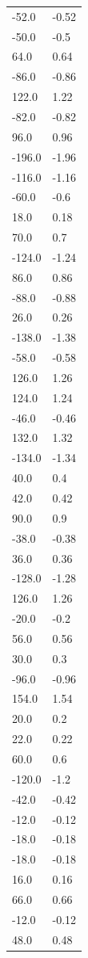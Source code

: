 \begin{longtable}{ll}
-52.0 & -0.52 \\
-50.0 & -0.5 \\
64.0 & 0.64 \\
-86.0 & -0.86 \\
122.0 & 1.22 \\
-82.0 & -0.82 \\
96.0 & 0.96 \\
-196.0 & -1.96 \\
-116.0 & -1.16 \\
-60.0 & -0.6 \\
18.0 & 0.18 \\
70.0 & 0.7 \\
-124.0 & -1.24 \\
86.0 & 0.86 \\
-88.0 & -0.88 \\
26.0 & 0.26 \\
-138.0 & -1.38 \\
-58.0 & -0.58 \\
126.0 & 1.26 \\
124.0 & 1.24 \\
-46.0 & -0.46 \\
132.0 & 1.32 \\
-134.0 & -1.34 \\
40.0 & 0.4 \\
42.0 & 0.42 \\
90.0 & 0.9 \\
-38.0 & -0.38 \\
36.0 & 0.36 \\
-128.0 & -1.28 \\
126.0 & 1.26 \\
-20.0 & -0.2 \\
56.0 & 0.56 \\
30.0 & 0.3 \\
-96.0 & -0.96 \\
154.0 & 1.54 \\
20.0 & 0.2 \\
22.0 & 0.22 \\
60.0 & 0.6 \\
-120.0 & -1.2 \\
-42.0 & -0.42 \\
-12.0 & -0.12 \\
-18.0 & -0.18 \\
-18.0 & -0.18 \\
16.0 & 0.16 \\
66.0 & 0.66 \\
-12.0 & -0.12 \\
48.0 & 0.48 \\

\end{longtable}
